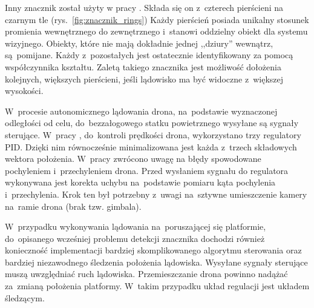 Inny znacznik został użyty w pracy \cite{Rings}. 
Składa się on z~czterech pierścieni na czarnym tle (rys.~\ref{fig:znacznik_rings})
Każdy pierścień posiada unikalny stosunek promienia wewnętrznego do zewnętrznego i~stanowi oddzielny obiekt dla systemu wizyjnego. 
Obiekty, które nie mają dokładnie jednej ,,dziury'' wewnątrz, są~pomijane. 
Każdy z~pozostałych jest ostatecznie identyfikowany za pomocą współczynnika kształtu. 
Zaletą takiego znacznika jest możliwość dołożenia kolejnych, większych pierścieni, jeśli lądowisko ma być widoczne z~większej wysokości.


W~procesie autonomicznego lądowania drona, na~podstawie wyznaczonej odległości od celu, do~bezzałogowego statku powietrznego wysyłane są sygnały sterujące. 
W~pracy \cite{Sudevan}, do~kontroli prędkości drona, wykorzystano trzy regulatory PID. 
Dzięki nim równocześnie minimalizowana jest każda z~trzech składowych wektora położenia. 
W~pracy \cite{Rings} zwrócono uwagę na błędy spowodowane pochyleniem i~przechyleniem drona. 
Przed wysłaniem sygnału do regulatora wykonywana jest korekta uchybu na~podstawie pomiaru kąta pochylenia i~przechylenia. 
Krok ten był potrzebny z~uwagi na~sztywne umieszczenie kamery na~ramie drona (brak tzw. gimbala). 

W~przypadku wykonywania lądowania na~poruszającej się platformie, do~opisanego wcześniej problemu detekcji znacznika dochodzi również konieczność implementacji bardziej skomplikowanego algorytmu sterowania oraz bardziej niezawodnego śledzenia położenia lądowiska. 
Wysyłane sygnały sterujące muszą uwzględniać ruch lądowiska. 
Przemieszczanie drona powinno nadążać za~zmianą położenia platformy. 
W~takim przypadku układ regulacji jest układem śledzącym.

